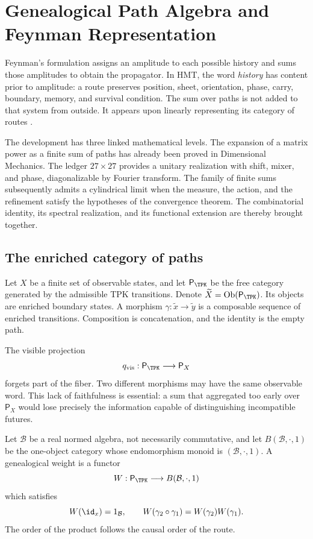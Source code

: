 \chapter{Genealogical Path Algebra and Feynman Representation}
\label{chap:integral-genealogica}

Feynman's formulation assigns an amplitude to each possible history and sums those amplitudes to obtain the propagator. In HMT, the word \emph{history} has content prior to amplitude: a route preserves position, sheet, orientation, phase, carry, boundary, memory, and survival condition. The sum over paths is not added to that system from outside. It appears upon linearly representing its category of routes \cite{Feynman1948,FeynmanHibbs1965}.

The development has three linked mathematical levels. The expansion of a
matrix power as a finite sum of paths has already been proved in Dimensional
Mechanics. The ledger \(27\times27\) provides a unitary realization
with shift, mixer, and phase, diagonalizable by Fourier transform. The family of finite
sums subsequently admits a cylindrical limit when the measure, the action, and the
refinement satisfy the hypotheses of the convergence theorem. The
combinatorial identity, its spectral realization, and its functional extension
are thereby brought together.

\section{The enriched category of paths}

Let \(X\) be a finite set of observable states, and let \(\mathsf P_{\TPK}\) be the free category generated by the admissible TPK transitions. Denote \(\widetilde X=\operatorname{Ob}(\mathsf P_{\TPK})\). Its objects are enriched boundary states. A morphism \(\gamma:\widetilde x\to\widetilde y\) is a composable sequence of enriched transitions. Composition is concatenation, and the identity is the empty path.

The visible projection
\[
 q_{\rm vis}:\mathsf P_{\TPK}\longrightarrow \mathsf P_X
\]
forgets part of the fiber. Two different morphisms may have the same
observable word. This lack of faithfulness is essential: a sum that aggregated too
early over \(\mathsf P_X\) would lose precisely the information capable of
distinguishing incompatible futures.

\begin{definition}
Let \(\mathcal B\) be a real normed algebra, not necessarily commutative, and
let \(B(\mathcal B,\cdot,1)\) be the one-object category whose endomorphism
monoid is \((\mathcal B,\cdot,1)\). A genealogical weight is a functor
\[
 W:\mathsf P_{\TPK}\longrightarrow B(\mathcal B,\cdot,1)
\]
which satisfies
\[
 W(\id_x)=1_{\mathcal B},\qquad
 W(\gamma_2\circ\gamma_1)=W(\gamma_2)W(\gamma_1).
\]
The order of the product follows the causal order of the route.
\end{definition}

